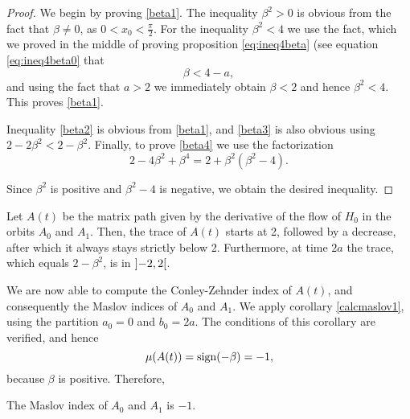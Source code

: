 \begin{proof}
We begin by proving \eqref{beta1}. The inequality $\beta^2 > 0$ is obvious from the fact that $\beta \neq 0$, as $0 < x_0 < \frac\pi2$. For the inequality $\beta^2 < 4$ we use the fact, which we proved in the middle of proving proposition \ref{eq:ineq4beta} (see equation \eqref{eq:ineq4beta0} that
\begin{equation}
\beta < 4 - a,
\end{equation}
and using the fact that $a > 2$ we immediately obtain $\beta < 2$ and hence $\beta^2 < 4$. This proves \eqref{beta1}.

Inequality \eqref{beta2} is obvious from \eqref{beta1}, and \eqref{beta3} is also obvious using $2 - 2 \beta^2 < 2 - \beta^2$. Finally, to prove \eqref{beta4} we use the factorization
\begin{equation}
2 - 4 \beta^2 + \beta^4 = 2 + \beta^2 (\beta^2 - 4).
\end{equation}

Since $\beta^2$ is positive and $\beta^2 - 4$ is negative, we obtain the desired inequality.
\end{proof}

\begin{corollary}
Let $A(t)$ be the matrix path given by the derivative of the flow of $H_0$ in the orbits $A_0$ and $A_1$. Then, the trace of $A(t)$ starts at 2, followed by a decrease, after which it always stays strictly below 2. Furthermore, at time $2a$ the trace, which equals $2 - \beta^2$, is in $\ointerval{-2}2$.
\end{corollary}

We are now able to compute the Conley-Zehnder index of $A(t)$, and consequently the Maslov indices of $A_0$ and $A_1$. We apply corollary \ref{calcmaslov1}, using the partition $a_0 = 0$ and $b_0 = 2a$. The conditions of this corollary are verified, and hence
\begin{equation}
\mu(A(t)) = \operatorname{sign}(-\beta) = -1,
\end{equation}
because $\beta$ is positive. Therefore,

\begin{prop}
The Maslov index of $A_0$ and $A_1$ is $-1$.
\end{prop}


